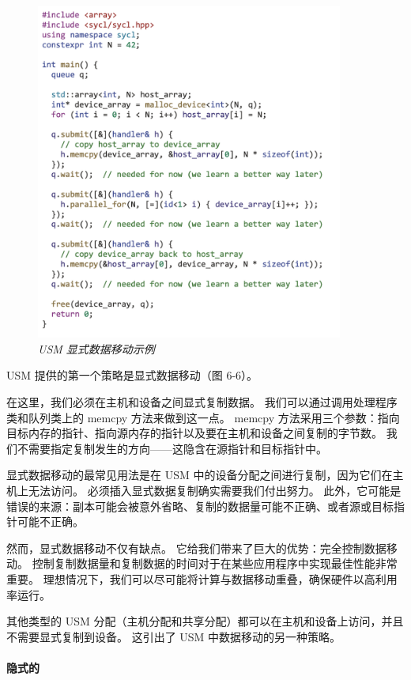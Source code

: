 \begin{figure}[H]
	\centering
	\includegraphics[width=0.9\textwidth]{figs/F6.6.png}
	\caption{\textit{USM 显式数据移动示例}}
\end{figure}

USM 提供的第一个策略是显式数据移动（图 6-6）。

在这里，我们必须在主机和设备之间显式复制数据。 我们可以通过调用处理程序类和队列类上的 memcpy 方法来做到这一点。 
memcpy 方法采用三个参数：指向目标内存的指针、指向源内存的指针以及要在主机和设备之间复制的字节数。 
我们不需要指定复制发生的方向——这隐含在源指针和目标指针中。

显式数据移动的最常见用法是在 USM 中的设备分配之间进行复制，因为它们在主机上无法访问。 
必须插入显式数据复制确实需要我们付出努力。 
此外，它可能是错误的来源：副本可能会被意外省略、复制的数据量可能不正确、或者源或目标指针可能不正确。

然而，显式数据移动不仅有缺点。 它给我们带来了巨大的优势：完全控制数据移动。 
控制复制数据量和复制数据的时间对于在某些应用程序中实现最佳性能非常重要。 
理想情况下，我们可以尽可能将计算与数据移动重叠，确保硬件以高利用率运行。

其他类型的 USM 分配（主机分配和共享分配）都可以在主机和设备上访问，并且不需要显式复制到设备。 
这引出了 USM 中数据移动的另一种策略。

\paragraph{隐式的}

